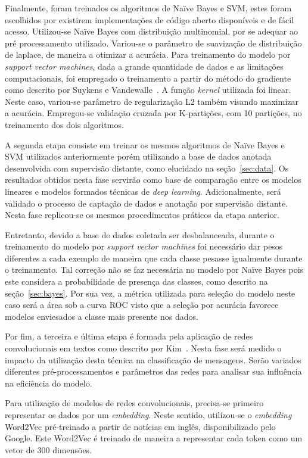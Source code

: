 Finalmente, foram treinados os algoritmos de Naïve Bayes e SVM, estes foram escolhidos por existirem implementações de
código aberto disponíveis e de fácil acesso.
Utilizou-se Naïve Bayes com distribuição multinomial, por se adequar ao pré processamento utilizado.
Variou-se o parâmetro de suavização de distribuição de laplace, de maneira a otimizar a acurácia.
Para treinamento do modelo por \textit{support vector machines}, dada a grande quantidade de dados e as limitações
computacionais, foi empregado o treinamento a partir do método do gradiente como descrito por Suykens e
Vandewalle~\cite{suykens99}.
A função \textit{kernel} utilizada foi linear.
Neste caso, variou-se parâmetro de regularização L2 também visando maximizar a acurácia.
Empregou-se validação cruzada por K-partições, com 10 partições, no treinamento dos dois algoritmos.

A segunda etapa consiste em treinar os mesmos algoritmos de Naïve Bayes e SVM utilizados anteriormente porém utilizando
a base de dados anotada desenvolvida com supervisão distante, como elucidado na seção~\ref{sec:data}.
Os resultados obtidos nesta fase servirão como base de comparação entre os modelos lineares e modelos formados técnicas
de \textit{deep learning}.
Adicionalmente, será validado o processo de captação de dados e anotação por supervisão distante.
Nesta fase replicou-se os mesmos procedimentos práticos da etapa anterior.

Entretanto, devido a base de dados coletada ser desbalanceada, durante o treinamento do modelo por
\textit{support vector machines} foi necessário dar pesos diferentes a cada exemplo de maneira que cada classe pesasse
igualmente durante o treinamento.
Tal correção não se faz necessária no modelo por Naïve Bayes pois este considera a probabilidade de presença das classes,
como descrito na seção~\ref{sec:bayes}.
Por sua vez, a métrica utilizada para seleção do modelo neste caso será a área sob a curva ROC visto que a seleção por
acurácia favorece modelos enviesados a classe mais presente nos dados.

Por fim, a terceira e última etapa é formada pela aplicação de redes convolucionais em textos como descrito por
Kim~\cite{kim14}.
Nesta fase será medido o impacto da utilização desta técnica na classificação de mensagens.
Serão variados diferentes pré-processamentos e parâmetros das redes para analisar sua influência na eficiência do
modelo.

Para utilização de modelos de redes convolucionais, precisa-se primeiro representar os dados por um \textit{embedding}.
Neste sentido, utilizou-se o \textit{embedding} Word2Vec pré-treinado a partir de notícias em inglês, disponibilizado
pelo Google.
Este Word2Vec é treinado de maneira a representar cada token como um vetor de 300 dimensões.

